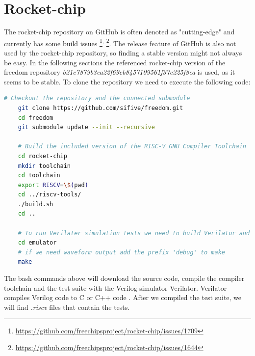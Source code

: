 \section{Rocket-chip} \label{sec:rocket-chip}
The rocket-chip repository on GitHub is often denoted as "cutting-edge"
and currently has some build issues
\footnote{\url{https://github.com/freechipsproject/rocket-chip/issues/1709}}\textsuperscript{,}
\footnote{\url{https://github.com/freechipsproject/rocket-chip/issues/1644}}.
The release feature of GitHub is also not used by the rocket-chip repository, 
so finding a stable version might not always be easy.
In the following sections the referenced rocket-chip version of the freedom
repository \textit{b21c7879b3ea22f69cb8457109561f37c225f8ea} is used, as it
seems to be stable.
To clone the repository we need to execute the following code:
\begin{lstlisting}[language=bash, frame=single]
    # Checkout the repository and the connected submodule
    git clone https://github.com/sifive/freedom.git
    cd freedom
    git submodule update --init --recursive
    
    # Build the included version of the RISC-V GNU Compiler Toolchain
    cd rocket-chip
    mkdir toolchain
    cd toolchain
    export RISCV=\$(pwd)
    cd ../riscv-tools/
    ./build.sh
    cd ..
    
    # To run Verilater simulation tests we need to build Verilator and the tests
    cd emulator
    # if we need waveform output add the prefix 'debug' to make
    make    
\end{lstlisting}
The bash commands above will download the source code, compile the compiler toolchain
and the test suite with the Verilog simulator Verilator.
Verilator compiles Verilog code to C or C++ code \cite{verilator_verilator}.
After we compiled the test suite, we will find \textit{.riscv} files that contain
the tests.

